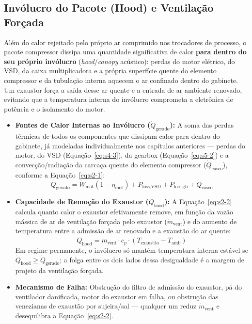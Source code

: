 \documentclass[12pt,a4paper]{article}
\numberwithin{equation}{section}
\numberwithin{table}{section}
\numberwithin{figure}{section}
\begin{document}
	\subsection{\textbf{Invólucro do Pacote (Hood) e Ventilação Forçada}}
	Além do calor rejeitado pelo próprio ar comprimido nos trocadores de processo, o pacote compressor dissipa uma quantidade significativa de calor \textbf{para dentro do seu próprio invólucro} (\textit{hood}/\textit{canopy} acústico): perdas do motor elétrico, do VSD, da caixa multiplicadora e a própria superfície quente do elemento compressor e da tubulação interna aquecem o ar confinado dentro do gabinete. Um exaustor força a saída desse ar quente e a entrada de ar ambiente renovado, evitando que a temperatura interna do invólucro comprometa a eletrônica de potência e o isolamento do motor.
	\begin{itemize}
		\item \textbf{Fontes de Calor Internas ao Invólucro ($\dot{Q}_{\text{gerado}}$):} A soma das perdas térmicas de todos os componentes que dissipam calor para dentro do gabinete, já modeladas individualmente nos capítulos anteriores — perdas do motor, do VSD (Equação~\eqref{eq:s4-3}), da gearbox (Equação~\eqref{eq:s5-2}) e a convecção/radiação da carcaça quente do elemento compressor ($\dot{Q}_{\text{casco}}$), conforme a Equação~\eqref{eq:s2-1}:
		\begin{equation}\label{eq:s2-1}
\dot{Q}_{\text{gerado}} = \dot{W}_{\text{mot}}(1 - \eta_{\text{mot}}) + P_{\text{loss,VSD}} + P_{\text{loss,gb}} + \dot{Q}_{\text{casco}}
\end{equation}
		\item \textbf{Capacidade de Remoção do Exaustor ($\dot{Q}_{\text{hood}}$):} A Equação~\eqref{eq:s2-2} calcula quanto calor o exaustor efetivamente remove, em função da vazão mássica de ar de ventilação forçada pelo exaustor ($\dot{m}_{\text{vent}}$) e do aumento de temperatura entre a admissão de ar renovado e a exaustão do ar quente:
		\begin{equation}\label{eq:s2-2}
\dot{Q}_{\text{hood}} = \dot{m}_{\text{vent}} \cdot c_p \cdot (T_{\text{exaustão}} - T_{\text{amb}})
\end{equation}
		Em regime permanente, o invólucro só mantém temperatura interna estável se $\dot{Q}_{\text{hood}} \ge \dot{Q}_{\text{gerado}}$; a folga entre os dois lados dessa desigualdade é a margem de projeto da ventilação forçada.
		\item \textbf{Mecanismo de Falha:} Obstrução do filtro de admissão do exaustor, pá do ventilador danificada, motor do exaustor em falha, ou obstrução das venezianas de exaustão por sujeira/sal — qualquer um reduz $\dot{m}_{\text{vent}}$ e desequilibra a Equação~\eqref{eq:s2-2}.

\end{itemize}
\end{document}
